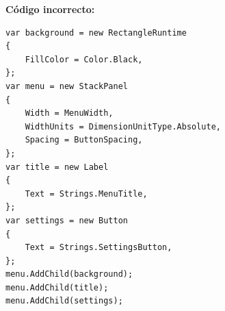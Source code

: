 \textbf{Código incorrecto:}
\begin{lstlisting}[style=csharpstyle]
var background = new RectangleRuntime
{
    FillColor = Color.Black,
};
var menu = new StackPanel
{
    Width = MenuWidth,
    WidthUnits = DimensionUnitType.Absolute,
    Spacing = ButtonSpacing,
};
var title = new Label
{
    Text = Strings.MenuTitle,
};
var settings = new Button
{
    Text = Strings.SettingsButton,
};
menu.AddChild(background);
menu.AddChild(title);
menu.AddChild(settings);
\end{lstlisting}
